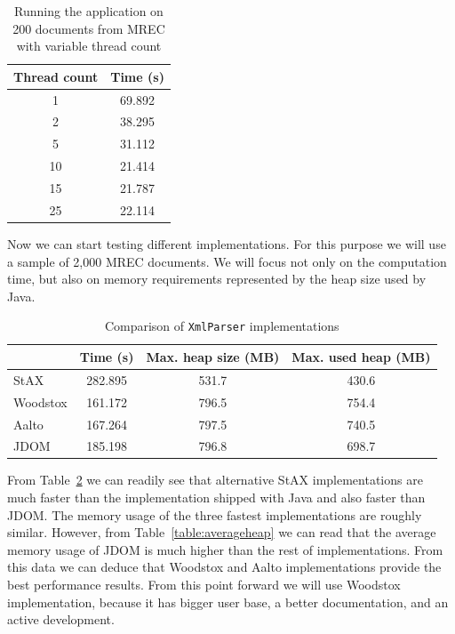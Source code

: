 \documentclass[11pt,oneside,final]{fithesis2}
\begin{document}
\begin{table}[!ht]
\centering
\begin{tabular}{|c|c|}
\hline
Thread count & Time (s) \\ \hline
\hline
1 & 69.892 \\ \hline
2 & 38.295 \\ \hline
5 & 31.112 \\ \hline
10 & 21.414 \\ \hline
15 & 21.787 \\ \hline
25 & 22.114 \\ \hline
\end{tabular}
\caption{Running the application on 200 documents from MREC with variable thread count}
\label{table:threadcount}
\end{table}

Now we can start testing different implementations. For this purpose we will use a sample of 2,000 MREC documents. We will focus not only on the computation time, but also on memory requirements represented by the heap size used by Java.

\begin{table}[!ht]
\centering
\begin{tabular}{|l|c|c|c|}
\hline
& Time (s) & Max. heap size (MB) & Max. used heap (MB) \\ \hline
\hline
StAX & 282.895 & 531.7 & 430.6 \\ \hline
Woodstox & 161.172 & 796.5 & 754.4 \\ \hline
Aalto & 167.264 & 797.5 & 740.5 \\ \hline
JDOM & 185.198 & 796.8 & 698.7 \\ \hline
\end{tabular}
\caption{Comparison of \texttt{XmlParser} implementations}
\label{table:comparison}
\end{table}

From Table~\ref{table:comparison} we can readily see that alternative StAX implementations are much faster than the implementation shipped with Java and also faster than JDOM. The memory usage of the three fastest implementations are roughly similar. However, from Table~\ref{table:averageheap} we can read that the average memory usage of JDOM is much higher than the rest of implementations. From this data we can deduce that Woodstox and Aalto implementations provide the best performance results. From this point forward we will use Woodstox implementation, because it has bigger user base, a better documentation, and an active development.
\end{document}
